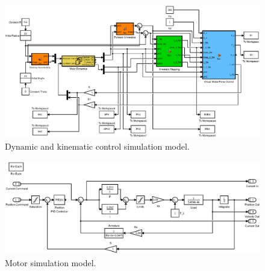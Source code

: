 \begin{figure}
\centering
\includegraphics[clip, trim=0cm 8cm 0cm 8cm,width=1\textwidth]{images/simulation/leg-simulation.eps}
\caption{Dynamic and kinematic control simulation model.}
\label{fig:Dynamic and kinematic simulation model}
\end{figure}

\begin{figure}
\centering
\includegraphics[clip, trim=0cm 10cm 0cm 10cm,width=1\textwidth]{images/simulation/motor-model.eps}
\caption{Motor simulation model.}
\label{fig:Motor simulation model}
\end{figure}


